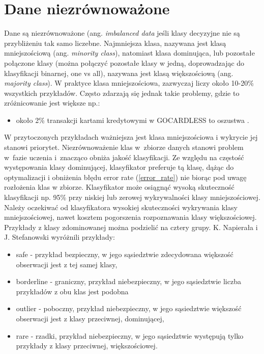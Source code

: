 \section{Dane niezrównoważone}
Dane są niezrównoważone (ang. \textit{imbalanced data} jeśli klasy decyzyjne nie są przybliżeniu tak samo liczebne. Najmniejsza klasa, nazywana jest klasą mniejszościową (ang. \textit{minority class}), natomiast klasa dominująca, lub pozostałe połączone klasy (można połączyć pozostałe klasy w jedną, doprowadzając do klasyfikacji binarnej, one vs all), nazywana jest klasą większościową (ang. \textit{majority class}). W praktyce klasa mniejszościowa, zazwyczaj liczy około 10-20\% wszystkich przykładów. Często zdarzają się jednak takie problemy, gdzie to zróżnicowanie jest większe np.:
\begin{itemize}
	\item około 2\% transakcji kartami kredytowymi w GOCARDLESS to oszustwa \cite{gocardless}.
	
\end{itemize}
W przytoczonych przykładach ważniejsza jest klasa mniejszościowa i wykrycie jej stanowi priorytet. Niezrównoważenie klas w zbiorze danych stanowi problem w fazie uczenia i znacząco obniża jakość klasyfikacji. Ze względu na częstość występowania klasy dominującej, klasyfikator preferuje tą klasę, dążąc do optymalizacji i obniżenia błędu error rate (\ref{error_rate}) nie biorąc pod uwagę rozłożenia klas w zbiorze. Klasyfikator może osiągnąć wysoką skuteczność klasyfikacji np. 95\% przy niskiej lub zerowej wykrywalności klasy mniejszościowej. 
Należy oczekiwać od klasyfikatora wysokiej skuteczności wykrywania klasy mniejszościowej, nawet kosztem pogorszenia rozpoznawania klasy większościowej.
Przykłady z klasy zdominowanej można podzielić na cztery grupy. K. Napierała i J. Stefanowski wyróżnili przykłady\cite{przykladyklas}:
\begin{itemize}
	\item safe - przykład bezpieczny, w jego sąsiedztwie zdecydowana większość obserwacji jest z tej samej klasy,
	\item borderline - graniczny, przykład niebezpieczny, w jego sąsiedztwie liczba przykładów z obu klas jest podobna
	\item outlier - poboczny, przykład niebezpieczny, w jego sąsiedztwie większość obserwacji jest z klasy przeciwnej, dominującej,
	\item rare - rzadki, przykład niebezpieczny, w jego sąsiedztwie występują tylko przykłady z klasy przeciwnej, większościowej.
\end{itemize}


